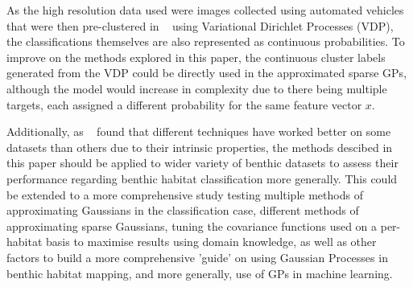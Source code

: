 \documentclass[10pt,sts]{article}
\begin{document}
\begin{multicols}{2}
As the high resolution data used were images collected using automated vehicles that were then pre-clustered in ~\citet{steinberg11} using Variational Dirichlet Processes (VDP), the classifications themselves are also represented as continuous probabilities. To improve on the methods explored in this paper, the continuous cluster labels generated from the VDP could be directly used in the approximated sparse GPs, although the model would increase in complexity due to there being multiple targets, each assigned a different probability for the same feature vector $x$. 

Additionally, as ~\citet{ahsan14} found that different techniques have worked better on some datasets than others due to their intrinsic properties, the methods descibed in this paper should be applied to wider variety of benthic datasets to assess their performance regarding benthic habitat classification more generally. This could be extended to a more comprehensive study testing multiple methods of approximating Gaussians in the classification case, different methods of approximating sparse Gaussians, tuning the covariance functions used on a per-habitat basis to maximise results using domain knowledge, as well as other factors to build a more comprehensive 'guide' on using Gaussian Processes in benthic habitat mapping, and more generally, use of GPs in machine learning.






\end{multicols}
\end{document}
